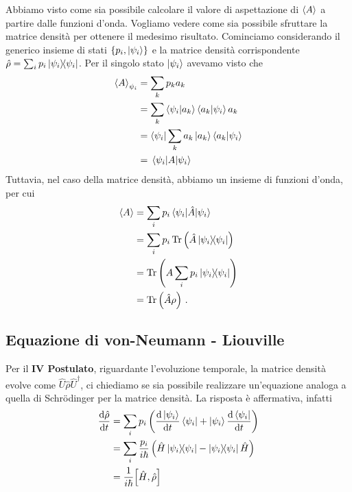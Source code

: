 \vspace{1cm}
\newline
{}
\vspace{0.5cm}
\noindent Abbiamo visto come sia possibile calcolare il valore di aspettazione di $\expval{A}$ a partire dalle funzioni d'onda. Vogliamo vedere come sia possibile sfruttare la matrice densità per ottenere il medesimo risultato. Cominciamo considerando il generico insieme di stati $\{p_i, \ket{\psi_i}\}$ e la matrice densità corrispondente $\hat \rho=\sum_i p_i\op{\psi_i}{\psi_i}$. Per il singolo stato $\ket{\psi_i}$ avevamo visto che
\begin{equation*}
    \begin{aligned}
        \expval{A}_{\psi_i} &= \sum_k p_k a_k \\
                            &= \sum_k \ip{\psi_i}{a_k}\ip{a_k}{\psi_i}a_k \\
                            &= \bra{\psi_i}\sum_k a_k \ket{a_k}\ip{a_k}{\psi_i} \\
                            &= \expval{A}{\psi_i}
    \end{aligned}
\end{equation*}
Tuttavia, nel caso della matrice densità, abbiamo un insieme di funzioni d'onda, per cui
\begin{equation*}
    \begin{aligned}
        \expval{A} &= \sum_i p_i \expval{\hat A}{\psi_i} \\
                   &= \sum_i p_i \Tr \left(\hat A\op{\psi_i}{\psi_i}\right) \\
                   &= \Tr \left(A\sum_i p_i \op{\psi_i}{\psi_i}\right) \\
                   &= \Tr\left(\hat A\rho\right) \, .
    \end{aligned}
\end{equation*}

\subsection*{Equazione di von-Neumann - Liouville}
Per il \textbf{IV Postulato}, riguardante l'evoluzione temporale, la matrice densità evolve come $\hat U \hat \rho \hat U^\dagger$, ci chiediamo se sia possibile realizzare un'equazione analoga a quella di Schrödinger per la matrice densità. La risposta è affermativa, infatti
\begin{equation*}
    \begin{aligned}
        \derivative{\hat \rho}{t} &= \sum_i p_i\left(\derivative{\ket{\psi_i}}{t}\bra{\psi_i}+\ket{\psi_i}\derivative{\bra{\psi_i}}{t}\right) \\
                                  &= \sum_i \frac{p_i}{i\hbar}\left(\hat H \op{\psi_i}{\psi_i}-\op{\psi_i}{\psi_i}\hat H\right) \\
                                  &= \frac{1}{i\hbar}\comm{\hat H}{\hat \rho}
    \end{aligned}
\end{equation*}

